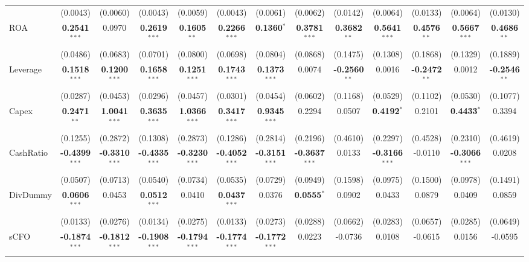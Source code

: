 \documentclass[11pt,a4paper]{article}
\begin{document}
\begin{table}[htbp]
\begin{tabular}{lcccccccccccc}
 & (0.0043) & (0.0060) & (0.0043) & (0.0059) & (0.0043) & (0.0061) & (0.0062) & (0.0142) & (0.0064) & (0.0133) & (0.0064) & (0.0130) \\
ROA & \textbf{0.2541}$^{***}$ & 0.0970 & \textbf{0.2619}$^{***}$ & \textbf{0.1605}$^{**}$ & \textbf{0.2266}$^{***}$ & \textbf{0.1360}$^{*}$ & \textbf{0.3781}$^{***}$ & \textbf{0.3682}$^{**}$ & \textbf{0.5641}$^{***}$ & \textbf{0.4576}$^{**}$ & \textbf{0.5667}$^{***}$ & \textbf{0.4686}$^{**}$ \\
 & (0.0486) & (0.0683) & (0.0701) & (0.0800) & (0.0698) & (0.0804) & (0.0868) & (0.1475) & (0.1308) & (0.1868) & (0.1329) & (0.1889) \\
Leverage & \textbf{0.1518}$^{***}$ & \textbf{0.1200}$^{***}$ & \textbf{0.1658}$^{***}$ & \textbf{0.1251}$^{***}$ & \textbf{0.1743}$^{***}$ & \textbf{0.1373}$^{***}$ & 0.0074 & \textbf{-0.2560}$^{**}$ & 0.0016 & \textbf{-0.2472}$^{**}$ & 0.0012 & \textbf{-0.2546}$^{**}$ \\
 & (0.0287) & (0.0453) & (0.0296) & (0.0457) & (0.0301) & (0.0454) & (0.0602) & (0.1168) & (0.0529) & (0.1102) & (0.0530) & (0.1077) \\
Capex & \textbf{0.2471}$^{**}$ & \textbf{1.0041}$^{***}$ & \textbf{0.3635}$^{***}$ & \textbf{1.0366}$^{***}$ & \textbf{0.3417}$^{***}$ & \textbf{0.9345}$^{***}$ & 0.2294 & 0.0507 & \textbf{0.4192}$^{*}$ & 0.2101 & \textbf{0.4433}$^{*}$ & 0.3394 \\
 & (0.1255) & (0.2872) & (0.1308) & (0.2873) & (0.1286) & (0.2814) & (0.2196) & (0.4610) & (0.2297) & (0.4528) & (0.2310) & (0.4619) \\
CashRatio & \textbf{-0.4399}$^{***}$ & \textbf{-0.3310}$^{***}$ & \textbf{-0.4335}$^{***}$ & \textbf{-0.3230}$^{***}$ & \textbf{-0.4052}$^{***}$ & \textbf{-0.3151}$^{***}$ & \textbf{-0.3637}$^{***}$ & 0.0133 & \textbf{-0.3166}$^{***}$ & -0.0110 & \textbf{-0.3066}$^{***}$ & 0.0208 \\
 & (0.0507) & (0.0713) & (0.0540) & (0.0734) & (0.0535) & (0.0729) & (0.0949) & (0.1598) & (0.0975) & (0.1500) & (0.0978) & (0.1491) \\
DivDummy & \textbf{0.0606}$^{***}$ & 0.0453 & \textbf{0.0512}$^{***}$ & 0.0410 & \textbf{0.0437}$^{***}$ & 0.0376 & \textbf{0.0555}$^{*}$ & 0.0902 & 0.0433 & 0.0879 & 0.0409 & 0.0859 \\
 & (0.0133) & (0.0276) & (0.0134) & (0.0275) & (0.0133) & (0.0273) & (0.0288) & (0.0662) & (0.0283) & (0.0657) & (0.0285) & (0.0649) \\
sCFO & \textbf{-0.1874}$^{***}$ & \textbf{-0.1812}$^{***}$ & \textbf{-0.1908}$^{***}$ & \textbf{-0.1794}$^{***}$ & \textbf{-0.1774}$^{***}$ & \textbf{-0.1772}$^{***}$ & 0.0223 & -0.0736 & 0.0108 & -0.0615 & 0.0156 & -0.0595 \\

\end{tabular}
\end{table}
\end{document}
